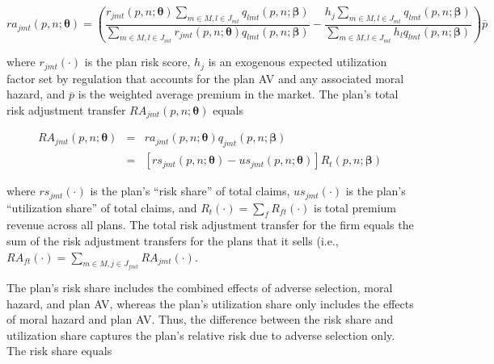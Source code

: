 \documentclass[12pt]{article}
\begin{document}
\vspace{-0.2in}

	$$
	ra_{jmt}(\textit{p},\textit{n};\boldsymbol{\theta}) = \left(\frac{r_{jmt}(\textit{p},\textit{n};\boldsymbol{\theta})\sum_{m \in M, l \in J_{mt}} q_{lmt}(\textit{p},\textit{n};\boldsymbol{\beta})}{\sum_{m \in M, l \in J_{mt}} r_{jmt}(\textit{p},\textit{n};\boldsymbol{\theta}) q_{lmt}(\textit{p},\textit{n};\boldsymbol{\beta})}    -     \frac{h_j\sum_{m \in M, l \in J_{mt}} q_{lmt}(\textit{p},\textit{n};\boldsymbol{\beta})}{\sum_{m \in M, l \in J_{mt}} h_l q_{lmt}(\textit{p},\textit{n};\boldsymbol{\beta})}\right)\overline{p}
	$$

\noindent where $r_{jmt}(\cdot)$ is the plan risk score, $h_j$ is an exogenous expected utilization factor set by regulation that accounts for the plan AV and any associated moral hazard, and $\overline{p}$ is the weighted average premium in the market.  The plan's total risk adjustment transfer $RA_{jmt}(\textit{p},\textit{n};\boldsymbol{\theta})$ equals

	\vspace{-0.4in}

	\begin{eqnarray}\label{ra_formula}
	RA_{jmt}(\textit{p},\textit{n};\boldsymbol{\theta}) &=& ra_{jmt}(\textit{p},\textit{n};\boldsymbol{\theta})  q_{jmt}(\textit{p},\textit{n};\boldsymbol{\beta}) \nonumber \\
	&= & \left[rs_{jmt}(\textit{p},\textit{n};\boldsymbol{\theta})  - us_{jmt}(\textit{p},\textit{n};\boldsymbol{\theta})  \right] R_t(\textit{p},\textit{n};\boldsymbol{\beta}) 
	\end{eqnarray}

	\vspace{-0.2in}

\noindent where $rs_{jmt}(\cdot)$ is the plan's ``risk share'' of total claims, $us_{jmt}(\cdot)$ is the plan's ``utilization share'' of total claims, and $R_t(\cdot) = \sum_f R_{ft}(\cdot)$ is total premium revenue across all plans. The total risk adjustment transfer for the firm equals the sum of the risk adjustment transfers for the plans that it sells (i.e., $RA_{ft}(\cdot) = \sum_{m \in M, j \in J_{fmt}} RA_{jmt}(\cdot)$.
	
The plan's risk share includes the combined effects of adverse selection, moral hazard, and plan AV, whereas the plan's utilization share only includes the effects of moral hazard and plan AV. Thus, the difference between the risk share and utilization share captures the plan's relative risk due to adverse selection only.   The risk share equals
\end{document}
